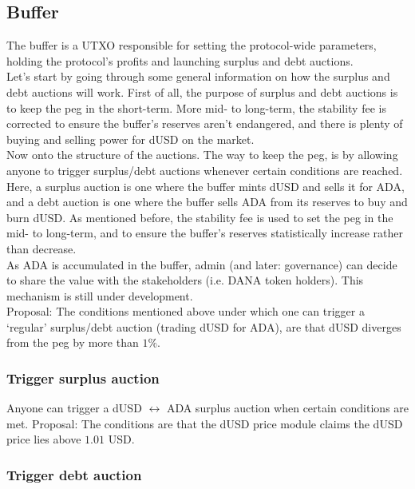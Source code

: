 \documentclass{article} %
\begin{document}
\subsection{Buffer}

The buffer is a UTXO responsible for setting the protocol-wide parameters,
holding the protocol's profits and launching surplus and debt auctions. \\

Let's start by going through some general information on how the surplus and
debt auctions will work.
First of all, the purpose of surplus and debt auctions is to keep the peg in the
short-term.
More mid- to long-term, the stability fee is corrected to ensure the buffer's
reserves aren't endangered, and there is plenty of buying and selling power for
dUSD on the market. \\

Now onto the structure of the auctions.
The way to keep the peg, is by allowing anyone to trigger surplus/debt auctions
whenever certain conditions are reached.
Here, a surplus auction is one where the buffer mints dUSD and sells it for ADA,
and a debt auction is one where the buffer sells ADA from its reserves to buy
and burn dUSD.
As mentioned before, the stability fee is used to set the peg in the mid- to
long-term, and to ensure the buffer's reserves statistically increase rather
than decrease. \\

As ADA is accumulated in the buffer, admin (and later: governance) can decide to
share the value with the stakeholders (i.e. DANA token holders).
This mechanism is still under development. \\

Proposal: The conditions mentioned above under which one can trigger a `regular'
surplus/debt auction (trading dUSD for ADA), are that dUSD diverges from the peg
by more than $1\%$.

\subsubsection{Trigger surplus auction}

Anyone can trigger a dUSD $\leftrightarrow$ ADA surplus auction when certain
conditions are met.
Proposal: The conditions are that the dUSD price module claims the dUSD price
lies above $1.01$ USD.

\subsubsection{Trigger debt auction}
\end{document}
